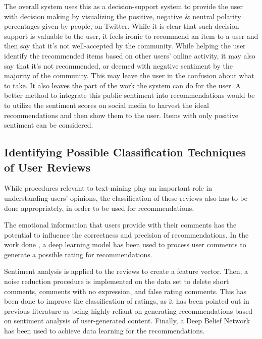 \documentclass[manuscript,screen,review]{acmart}
\begin{document}
The overall system uses this as a decision-support system to provide the user with decision making by visualizing the positive, negative \& neutral polarity percentages given by people, on Twitter. While it is clear that such decision support is valuable to the user, it feels ironic to recommend an item to a user and then say that it's not well-accepted by the community. While helping the user identify the recommended items based on other users' online activity, it may also say that it's not recommended, or deemed with negative sentiment by the majority of the community. This may leave the user in the confusion about what to take. It also leaves the part of the work the system can do for the user. A better method to integrate this public sentiment into recommendations would be to utilize the sentiment scores on social media to harvest the ideal recommendations and then show them to the user. Items with only positive sentiment can be considered.


\subsection{Identifying Possible Classification Techniques of User Reviews}

While procedures relevant to text-mining play an important role in understanding users' opinions, the classification of these reviews also has to be done appropriately, in order to be used for recommendations.

The emotional information that users provide with their comments has the potential to influence the correctness and precision of recommendations. In the work done \cite{chen_user_2019}, a deep learning model has been used to process user comments to generate a possible rating for recommendations.

Sentiment analysis is applied to the reviews to create a feature vector. Then, a noise reduction procedure is implemented on the data set to delete short comments, comments with no expression, and false rating comments. This has been done to improve the classification of ratings, as it has been pointed out in previous literature\cite{cheng_hybrid_2020} as being highly reliant on generating recommendations based on sentiment analysis of user-generated content. Finally, a Deep Belief Network has been used to achieve data learning for the recommendations.
\end{document}
